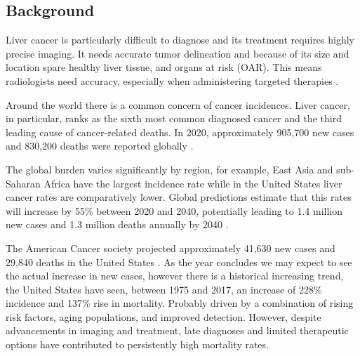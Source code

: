 \documentclass[11pt]{article} %
\begin{document}
\begin{multicols}{2}

\section{Background}

Liver cancer is particularly difficult to diagnose and its treatment requires highly precise imaging. It needs accurate tumor delineation and because of its size and location spare healthy liver tissue, and organs at risk (OAR). This means radiologists need accuracy, especially when administering targeted therapies \cite{beaton2019, floridi2022}.

Around the world there is a common concern of cancer incidences. Liver cancer, in particular, ranks as the sixth most common diagnosed cancer and the third leading cause of cancer-related deaths. In 2020, approximately 905,700 new cases and 830,200 deaths were reported globally \cite{journal_of_hepatology2022}. 


The global burden varies significantly by region, for example, East Asia and sub-Saharan Africa have the largest incidence rate while in the United States liver cancer rates are comparatively lower. Global predictions estimate that this rates will increase by 55\% between 2020 and 2040, potentially leading to 1.4 million new cases and 1.3 million deaths annually by 2040 \cite{journal_of_hepatology2022}.

The American Cancer society projected approximately 41,630 new cases and 29,840 deaths in the United States \cite{cancer_stats2024}. As the year concludes we may expect to see the actual increase in new cases, however there is a historical increasing trend, the United States have seen, between 1975 and 2017, an increase of 228\% incidence and 137\% rise in mortality. Probably driven by a combination of rising risk factors, aging populations, and improved detection. However, despite advancements in imaging and treatment, late diagnoses and limited therapeutic options have contributed to persistently high mortality rates.


\end{multicols}
\end{document}
